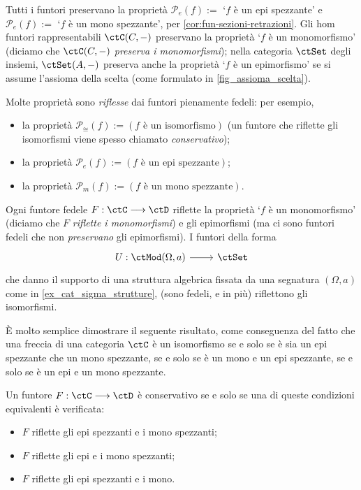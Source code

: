 \begin{proposition}\label{prop_preserva_riflette}
	Tutti i funtori preservano la proprietà \(\mathcal P_e(f) :=\) `\(f\) è un epi spezzante' e \(\mathcal P_e(f) :=\) `\(f\) è un mono spezzante', per \ref{cor:fun-sezioni-retrazioni}. Gli hom funtori rappresentabili \(\Hom\ctC(C,-)\) preservano la proprietà `\(f\) è un monomorfismo' (diciamo che \(\Hom\ctC(C,-)\) \emph{preserva i monomorfismi}); nella categoria \(\ctSet\) degli insiemi, \(\Hom\ctSet(A,-)\) preserva anche la proprietà `\(f\) è un epimorfismo' se si assume l'assioma della scelta (come formulato in \ref{fig_assioma_scelta}).

	Molte proprietà sono \emph{riflesse} dai funtori pienamente fedeli: per esempio,
	\begin{itemize}
		\item la proprietà \(\mathcal P_\cong(f) := (f \text{ è un isomorfismo})\) (un funtore che riflette gli isomorfismi viene spesso chiamato \emph{conservativo});
		\item la proprietà \(\mathcal P_e(f) := (f \text{ è un epi spezzante})\);
		\item la proprietà \(\mathcal P_m(f) := (f \text{ è un mono spezzante})\).
	\end{itemize}
	Ogni funtore fedele \(F : \ctC\fun\ctD\) riflette la proprietà `\(f\) è un monomorfismo' (diciamo che \(F\) \emph{riflette i monomorfismi}) e gli epimorfismi (ma ci sono funtori fedeli che non \emph{preservano} gli epimorfismi). I funtori della forma
	\[\dmFun{U}{\ctMod(\Omega,a)}{\ctSet}\]
	che danno il supporto di una struttura algebrica fissata da una segnatura \((\Omega,a)\) come in \ref{ex_cat_sigma_strutture}, (sono fedeli, e in più) riflettono gli isomorfismi.
\end{proposition}
\`E molto semplice dimostrare il seguente risultato, come conseguenza del fatto che una freccia di una categoria \(\ctC\) è un isomorfismo se e solo se è sia un epi spezzante che un mono spezzante, se e solo se è un mono e un epi spezzante, se e solo se è un epi e un mono spezzante.
\begin{lemma}\label{lemma_conservativo_iff_monoepi_spez}
	Un funtore \(F : \ctC\fun\ctD\) è conservativo se e solo se una di queste condizioni equivalenti è verificata:
	\begin{itemize}
		\item \(F\) riflette gli epi spezzanti e i mono spezzanti;
		\item \(F\) riflette gli epi e i mono spezzanti;
		\item \(F\) riflette gli epi spezzanti e i mono.
	\end{itemize}
\end{lemma}
